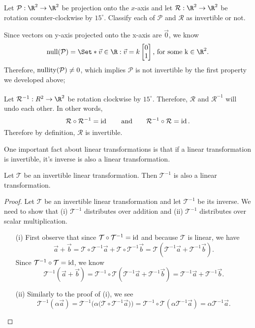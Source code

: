 \begin{example}
	Let $\mathcal P:\R^2\to\R^2$ be projection onto the $x$-axis and let $\mathcal R:\R^2\to\R^2$ be rotation counter-clockwise
	by $15^\circ$. Classify each of $\mathcal P$ and $\mathcal R$ as invertible or not.
	
	Since vectors on y-axis projected onto the x-axis are $\vec 0$, we know
	\[
	    \Null(\mathcal P)=\Set*{\vec v\in\R:\vec v=k\mat{0\\1}\text{, for some k}\in\R^2}.
	\]
	Therefore, $\operatorname{nullity}(\mathcal P) \neq 0$, which implies $\mathcal P$ is not invertible by the first property we developed above;\\
	\\
	Let $\mathcal R^{-1}: R^2\to\R^2$ be rotation clockwise by $15^\circ$. Therefore, $\mathcal R$ and $\mathcal R^{-1}$ will undo each other. In other words,
	\[
	    \mathcal R\circ \mathcal R^{-1}=\operatorname{\operatorname{id}}\qquad\text{and}\qquad \mathcal R^{-1}\circ \mathcal R=\operatorname{\operatorname{id}}.
	\]
	Therefore by definition, $\mathcal R$ is invertible. 
\end{example}

One important fact about linear transformations is that if a linear transformation is invertible,
it's inverse is also a linear transformation.
\begin{theorem}
	Let $\mathcal T$ be an invertible linear transformation. Then $\mathcal T^{-1}$ is also
	a linear transformation.
\end{theorem}
\begin{proof}
	Let $\mathcal T$ be an invertible linear transformation and let $\mathcal T^{-1}$ be its inverse.
	We need to show that (i) $\mathcal T^{-1}$ distributes over addition and (ii) $\mathcal T^{-1}$
	distributes over scalar multiplication.
	\begin{enumerate}
		\item[(i)] First observe that since $\mathcal T\circ \mathcal T^{-1}=\operatorname{\operatorname{id}}$ and because $\mathcal T$ is linear, we have
		\[
			\vec a+\vec b = \mathcal T\circ \mathcal T^{-1}\vec a+\mathcal T\circ \mathcal T^{-1}\vec b=
			\mathcal T(\mathcal T^{-1}\vec a+ \mathcal T^{-1}\vec b).
		\]
		Since $\mathcal T^{-1}\circ \mathcal T=\operatorname{\operatorname{id}}$, we know
		\[
			\mathcal T^{-1}(\vec a+\vec b) = 
			\mathcal T^{-1}\circ\mathcal T(\mathcal T^{-1}\vec a+ \mathcal T^{-1}\vec b)=
			\mathcal T^{-1}\vec a+ \mathcal T^{-1}\vec b.
		\]
		\item[(ii)] Similarly to the proof of (i), we see
		\[
			\mathcal T^{-1}(\alpha\vec a) = \mathcal T^{-1}\Big(\alpha \big(\mathcal T\circ \mathcal T^{-1}\vec a\big)\Big)
			=\mathcal T^{-1}\circ \mathcal T(\alpha \mathcal T^{-1}\vec a) = \alpha\mathcal T^{-1}\vec a.
		\]
	\end{enumerate}
\end{proof}

